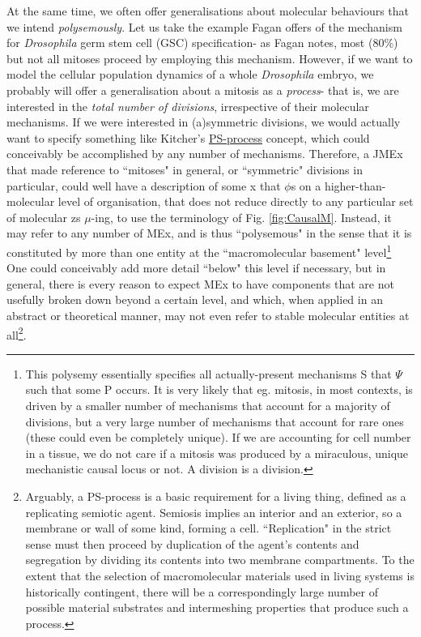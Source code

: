  At the same time, we often offer generalisations about molecular behaviours that we intend \textit{polysemously}. Let us take the example Fagan offers of the mechanism for \textit{Drosophila} germ stem cell (GSC) specification- as Fagan notes, most (80\%) but not all mitoses proceed by employing this mechanism. However, if we want to model the cellular population dynamics of a whole \textit{Drosophila} embryo, we probably will offer a generalisation about a mitosis as a \textit{process}- that is, we are interested in the \textit{total number of divisions}, irrespective of their molecular mechanisms. If we were interested in (a)symmetric divisions, we would actually want to specify something like Kitcher's \hyperref[PS]{PS-process} concept, which could conceivably be accomplished by any number of mechanisms. Therefore, a JMEx that made reference to ``mitoses" in general, or ``symmetric" divisions in particular, could well have a description of some x that $\phi$s on a higher-than-molecular level of organisation, that does not reduce directly to any particular set of molecular zs $\mu$-ing, to use the terminology of Fig. \ref{fig:CausalM}. Instead, it may refer to any number of MEx, and is thus ``polysemous" in the sense that it is constituted by more than one entity at the ``macromolecular basement" level\footnote{This polysemy essentially specifies all actually-present mechanisms S that $\Psi$ such that some P occurs. It is very likely that eg. mitosis, in most contexts, is driven by a smaller number of mechanisms that account for a majority of divisions, but a very large number of mechanisms that account for rare ones (these could even be completely unique). If we are accounting for cell number in a tissue, we do not care if a mitosis was produced by a miraculous, unique mechanistic causal locus or not. A division is a division.}  One could conceivably add more detail ``below" this level if necessary, but in general, there is every reason to expect MEx to have components that are not usefully broken down beyond a certain level, and which, when applied in an abstract or theoretical manner, may not even refer to stable molecular entities at all\footnote{Arguably, a PS-process is a basic requirement for a living thing, defined as a replicating semiotic agent. Semiosis implies an interior and an exterior, so a membrane or wall of some kind, forming a cell. ``Replication" in the strict sense must then proceed by duplication of the agent's contents and segregation by dividing its contents into two membrane compartments. To the extent that the selection of macromolecular materials used in living systems is historically contingent, there will be a correspondingly large number of possible material substrates and intermeshing properties that produce such a process.}.
 
